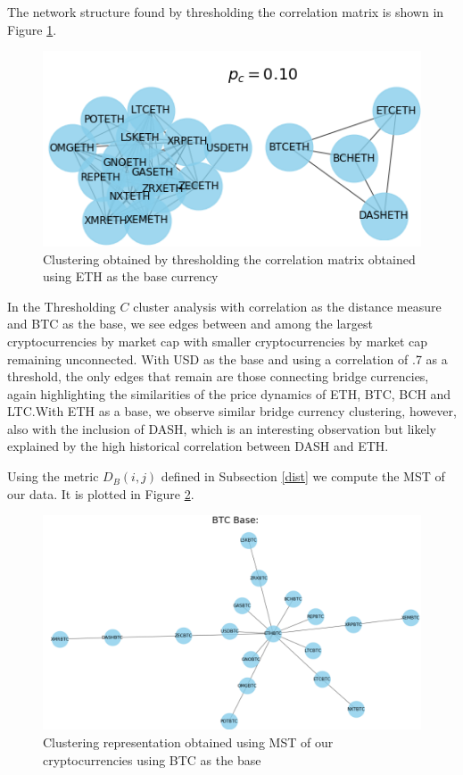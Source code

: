 \documentclass[a4paper]{article}
\begin{document}
\begin{multicols}{2}
The network structure found by thresholding the correlation matrix is shown in Figure \ref{fig:Cthres_crypto}.
\begin{figure}[H]
\centering
    \includegraphics[totalheight=4.2cm]{Cthres_crypt.png}
    \caption{Clustering obtained by thresholding the correlation matrix obtained using ETH as the base currency}
    \label{fig:Cthres_crypto}
\end{figure}
In the Thresholding $C$ cluster analysis with correlation as the distance measure and BTC as the base, we see edges between and among the largest cryptocurrencies by market cap with smaller cryptocurrencies by market cap remaining unconnected. With USD as the base and using a correlation of .7 as a threshold, the only edges that remain are those connecting bridge currencies, again highlighting the similarities of the price dynamics of ETH, BTC, BCH and LTC.With ETH as a base, we observe similar bridge currency clustering, however, also with the inclusion of DASH, which is an interesting observation but likely explained by the high historical correlation between DASH and ETH.

Using the metric $D_B(i,j)$ defined in Subsection \ref{dist} we compute the MST of our data. It is plotted in Figure \ref{fig:MST_crypto}.
\end{multicols}
\begin{figure}[H]
\centering
    \includegraphics[totalheight=6.5cm]{MST_cropped.PNG}
    \caption{Clustering representation obtained using MST of our cryptocurrencies using BTC as the base}
    \label{fig:MST_crypto}
\end{figure}
\end{document}
